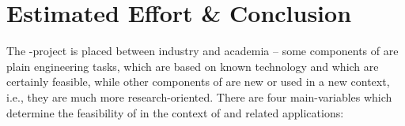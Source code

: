 \documentclass[a4paper, 10pt]{book}
\begin{document}

                                        \chapter{Estimated Effort \& Conclusion}

                                        The \SYNEIGHT-project is placed between industry and academia -- some
                                        components of \SYNEIGHT are plain engineering tasks, which are based on
                                        known technology and which are certainly feasible, while other
                                        components of \SYNEIGHT are new or used in a new context, i.e., they are
                                        much more research-oriented. There are four main-variables which
                                        determine the feasibility of \SYNEIGHT in the context of \MMORGS and
                                        related applications:
\end{document}
